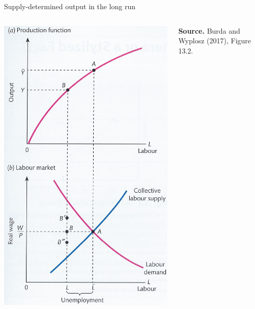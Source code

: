 \documentclass{beamer}
\begin{document}
\begin{frame}{Supply-determined output in the long run}
\begin{columns}
\centering
\includegraphics[clip,width=1.1\columnwidth]{FIGURES/8_LongRun}

\begin{minipage}{1.0\columnwidth}
\tiny	
\textbf{Source.} Burda and Wyplosz (2017), Figure 13.2.\\
\end{minipage}
	
\end{columns} 	       

\end{frame}
\end{document}
